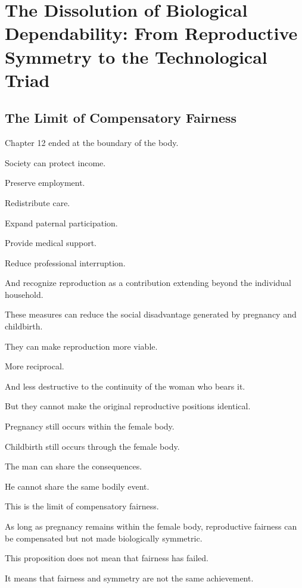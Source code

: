 
\section{The Dissolution of Biological Dependability: From Reproductive Symmetry to the Technological Triad}

\subsection*{\textbf{The Limit of Compensatory Fairness}}

Chapter 12 ended at the boundary of the body.

Society can protect income.

Preserve employment.

Redistribute care.

Expand paternal participation.

Provide medical support.

Reduce professional interruption.

And recognize reproduction as a contribution extending beyond the individual household.

These measures can reduce the social disadvantage generated by pregnancy and childbirth.

They can make reproduction more viable.

More reciprocal.

And less destructive to the continuity of the woman who bears it.

But they cannot make the original reproductive positions identical.

Pregnancy still occurs within the female body.

Childbirth still occurs through the female body.

The man can share the consequences.

He cannot share the same bodily event.

This is the limit of compensatory fairness.

As long as pregnancy remains within the female body, reproductive fairness can be compensated but not made biologically symmetric.

This proposition does not mean that fairness has failed.

It means that fairness and symmetry are not the same achievement.

